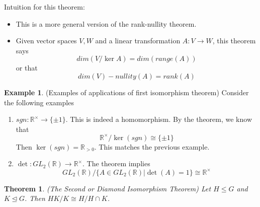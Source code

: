 \documentclass[12pt]{article}
\newtheorem{theorem}{Theorem}
\theoremstyle{definition}
\newtheorem{example}{Example}
\theoremstyle{definition}
\newcommand{\R}{\mathbb{R}}
\begin{document}
Intuition for this theorem:
\begin{itemize}
	\item This is a more general version of the rank-nullity theorem.
	\item Given vector spaces $V, W$ and a linear transformation $A : V \to W$, this theorem says
	\begin{equation}
		dim( V / \ker A ) = dim (range(A))
	\end{equation}
	or that
	\begin{equation}
		dim(V) - nullity(A) = rank(A)
	\end{equation}
\end{itemize}

\begin{example}(Examples of applications of first isomorphism theorem) Consider the following examples
\begin{enumerate}
	\item $sgn : \R^{\times} \to \{\pm 1 \}$. This is indeed a homomorphism. By the theorem, we know that
	\begin{equation}
		\R^{\times} /\ker(sgn) \cong \{ \pm 1\}
	\end{equation}
	Then $\ker(sgn) = \R_{>0}$. This matches the previous example. 
	\item $\det : GL_2(\mathbb{R}) \to \R^{\times}$. The theorem implies
	\begin{equation}
		GL_2(\mathbb{R}) / \{A \in GL_2(\mathbb{R}) | \det(A) = 1 \} \cong \R^{\times}
	\end{equation}
\end{enumerate}

\end{example}

\begin{theorem}(The Second or Diamond Isomorphism Theorem)
Let $H \leq G$ and $K \trianglelefteq G$. Then $HK / K \cong H / H \cap K$. 
\end{theorem}
\end{document}
